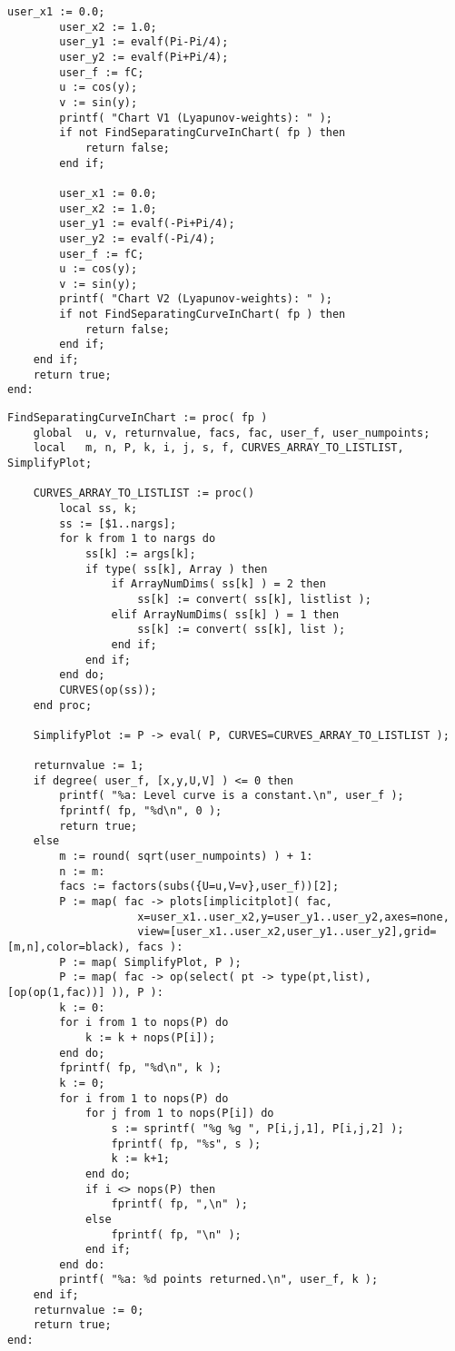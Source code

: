 \documentclass[a4paper,10pt]{article}
\begin{document}
\begin{lstlisting}[name=separatingcurves]
        user_x1 := 0.0;
        user_x2 := 1.0;
        user_y1 := evalf(Pi-Pi/4);
        user_y2 := evalf(Pi+Pi/4);
        user_f := fC;
        u := cos(y);
        v := sin(y);
        printf( "Chart V1 (Lyapunov-weights): " );
        if not FindSeparatingCurveInChart( fp ) then
            return false;
        end if;

        user_x1 := 0.0;
        user_x2 := 1.0;
        user_y1 := evalf(-Pi+Pi/4);
        user_y2 := evalf(-Pi/4);
        user_f := fC;
        u := cos(y);
        v := sin(y);
        printf( "Chart V2 (Lyapunov-weights): " );
        if not FindSeparatingCurveInChart( fp ) then
            return false;
        end if;
    end if;
    return true;
end:
\end{lstlisting}

\begin{lstlisting}[name=separatingcurves]
FindSeparatingCurveInChart := proc( fp )
    global  u, v, returnvalue, facs, fac, user_f, user_numpoints;
    local   m, n, P, k, i, j, s, f, CURVES_ARRAY_TO_LISTLIST, SimplifyPlot;

    CURVES_ARRAY_TO_LISTLIST := proc()
        local ss, k;
        ss := [$1..nargs];
        for k from 1 to nargs do
            ss[k] := args[k];
            if type( ss[k], Array ) then
                if ArrayNumDims( ss[k] ) = 2 then
                    ss[k] := convert( ss[k], listlist );
                elif ArrayNumDims( ss[k] ) = 1 then
                    ss[k] := convert( ss[k], list );
                end if;
            end if;
        end do;
        CURVES(op(ss));
    end proc;

    SimplifyPlot := P -> eval( P, CURVES=CURVES_ARRAY_TO_LISTLIST );

    returnvalue := 1;
    if degree( user_f, [x,y,U,V] ) <= 0 then
        printf( "%a: Level curve is a constant.\n", user_f );
        fprintf( fp, "%d\n", 0 );
        return true;
    else
        m := round( sqrt(user_numpoints) ) + 1:
        n := m:
        facs := factors(subs({U=u,V=v},user_f))[2];
        P := map( fac -> plots[implicitplot]( fac,
                    x=user_x1..user_x2,y=user_y1..user_y2,axes=none,
                    view=[user_x1..user_x2,user_y1..user_y2],grid=[m,n],color=black), facs ):
        P := map( SimplifyPlot, P );
        P := map( fac -> op(select( pt -> type(pt,list), [op(op(1,fac))] )), P ):
        k := 0:
        for i from 1 to nops(P) do
            k := k + nops(P[i]);
        end do;
        fprintf( fp, "%d\n", k );
        k := 0;
        for i from 1 to nops(P) do
            for j from 1 to nops(P[i]) do
                s := sprintf( "%g %g ", P[i,j,1], P[i,j,2] );
                fprintf( fp, "%s", s );
                k := k+1;
            end do;
            if i <> nops(P) then
                fprintf( fp, ",\n" );
            else
                fprintf( fp, "\n" );
            end if;
        end do:
        printf( "%a: %d points returned.\n", user_f, k );
    end if;
    returnvalue := 0;
    return true;
end:
\end{lstlisting}
\end{document}
